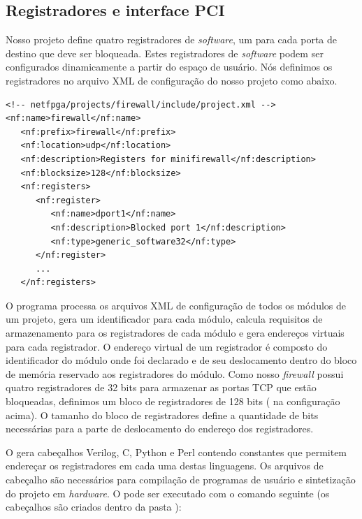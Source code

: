 \subsection{Registradores e interface PCI}
\label{sec:impl.regs}

Nosso projeto define quatro registradores de \emph{software}, um
para cada porta de destino que deve ser bloqueada.  Estes
registradores de \emph{software} podem ser configurados
dinamicamente a partir do espaço de usuário.  Nós definimos os
registradores no arquivo XML de configuração do nosso projeto como
abaixo.

\begin{verbatim}
<!-- netfpga/projects/firewall/include/project.xml -->
<nf:name>firewall</nf:name>
   <nf:prefix>firewall</nf:prefix>
   <nf:location>udp</nf:location>
   <nf:description>Registers for minifirewall</nf:description>
   <nf:blocksize>128</nf:blocksize>
   <nf:registers>
      <nf:register>
         <nf:name>dport1</nf:name>
         <nf:description>Blocked port 1</nf:description>
         <nf:type>generic_software32</nf:type>
      </nf:register>
      ...
   </nf:registers>
\end{verbatim}

O programa  processa os arquivos XML de
configuração de todos os módulos de um projeto, gera um
identificador para cada módulo, calcula requisitos de armazenamento
para os registradores de cada módulo e gera endereços virtuais para
cada registrador.\footnotemark{}  O endereço virtual de um
registrador é composto do identificador do módulo onde foi declarado
e de seu deslocamento dentro do bloco de memória reservado aos
registradores do módulo.  Como nosso \emph{firewall} possui quatro
registradores de 32 bits para armazenar as portas TCP que estão
bloqueadas, definimos um bloco de registradores de 128 bits
( na configuração acima).  O tamanho do bloco de
registradores define a quantidade de bits necessárias para a parte
de deslocamento do endereço dos registradores.


O  gera cabeçalhos Verilog, C, Python e Perl
contendo constantes que permitem endereçar os registradores em cada
uma destas linguagens.  Os arquivos de cabeçalho são necessários
para compilação de programas de usuário e sintetização do projeto em
\emph{hardware}.  O  pode ser executado com o
comando seguinte (os cabeçalhos são criados dentro da pasta
):

